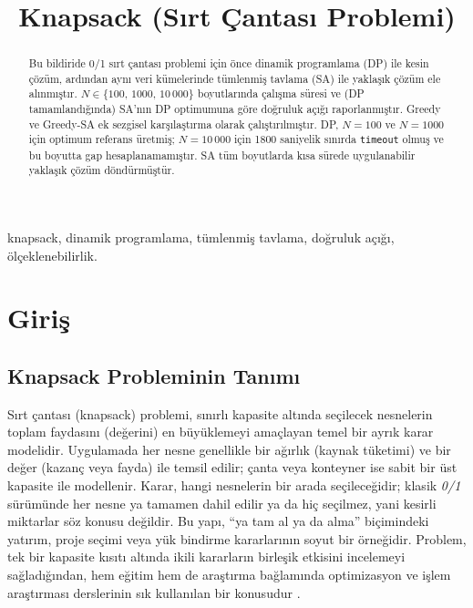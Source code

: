 \documentclass[conference,a4paper]{IEEEtran}
\title{Knapsack (Sırt Çantası Problemi)}
\author{
\IEEEauthorblockN{İrem Kaya -- 232803060}
\IEEEauthorblockA{
Manisa Celal Bayar Üniversitesi\\
Yazılım Mühendisliği Bölümü
}
}
\begin{document}
\shorthandoff{=}

\renewcommand{\refname}{Kaynakça}

\maketitle

\begin{abstract}
Bu bildiride 0/1 sırt çantası problemi için önce dinamik programlama (DP) ile kesin çözüm, ardından aynı veri kümelerinde tümlenmiş tavlama (SA) ile yaklaşık çözüm ele alınmıştır. $N \in \{100,\,1000,\,10\,000\}$ boyutlarında çalışma süresi ve (DP tamamlandığında) SA'nın DP optimumuna göre doğruluk açığı raporlanmıştır. Greedy ve Greedy-SA ek sezgisel karşılaştırma olarak çalıştırılmıştır. DP, $N{=}100$ ve $N{=}1000$ için optimum referans üretmiş; $N{=}10\,000$ için 1800 saniyelik sınırda \texttt{timeout} olmuş ve bu boyutta gap hesaplanamamıştır. SA tüm boyutlarda kısa sürede uygulanabilir yaklaşık çözüm döndürmüştür.
\end{abstract}

\begin{IEEEkeywords}
knapsack, dinamik programlama, tümlenmiş tavlama, doğruluk açığı, ölçeklenebilirlik.
\end{IEEEkeywords}

\section{Giriş}

\subsection{Knapsack Probleminin Tanımı}
Sırt çantası (knapsack) problemi, sınırlı kapasite altında seçilecek nesnelerin toplam faydasını (değerini) en büyüklemeyi amaçlayan temel bir ayrık karar modelidir. Uygulamada her nesne genellikle bir ağırlık (kaynak tüketimi) ve bir değer (kazanç veya fayda) ile temsil edilir; çanta veya konteyner ise sabit bir üst kapasite ile modellenir. Karar, hangi nesnelerin bir arada seçileceğidir; klasik \emph{0/1} sürümünde her nesne ya tamamen dahil edilir ya da hiç seçilmez, yani kesirli miktarlar söz konusu değildir. Bu yapı, ``ya tam al ya da alma'' biçimindeki yatırım, proje seçimi veya yük bindirme kararlarının soyut bir örneğidir. Problem, tek bir kapasite kısıtı altında ikili kararların birleşik etkisini incelemeyi sağladığından, hem eğitim hem de araştırma bağlamında optimizasyon ve işlem araştırması derslerinin sık kullanılan bir konusudur \cite{martello1990knapsack}.
\end{document}
